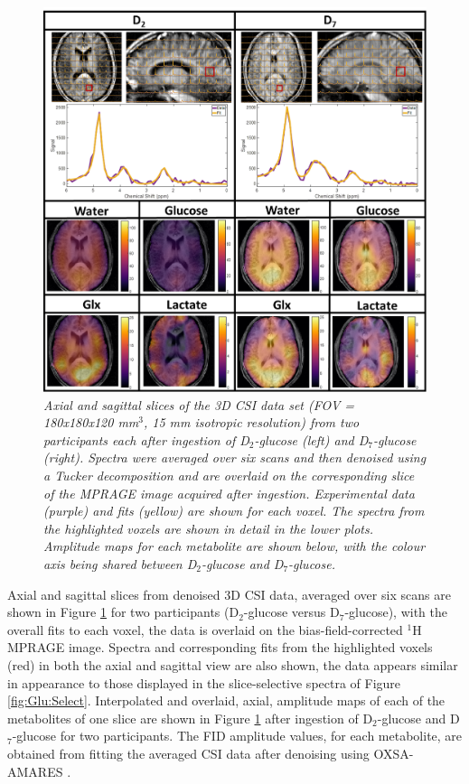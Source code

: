\begin{figure}
    \centering
    \includegraphics[width = 1\textwidth]{Figures/Glucose/CSI.png}
    \caption{\textit{Axial and sagittal slices of the 3D \ac{CSI} data set (\ac{FOV} = 180x180x120 mm$^3$, 15 mm isotropic resolution) from two participants each after ingestion of D$_2$-glucose (left) and D$_7$-glucose (right). Spectra were averaged over six scans and then denoised using a Tucker decomposition and are overlaid on the corresponding slice of the \ac{MPRAGE} image acquired after ingestion. Experimental data (purple) and fits (yellow) are shown for each voxel. The spectra from the highlighted voxels are shown in detail in the lower plots. Amplitude maps for each metabolite are shown below, with the colour axis being shared between D$_2$-glucose and D$_7$-glucose.}}
    \label{fig:Glu:CSI}
\end{figure}

Axial and sagittal slices from denoised 3D \ac{CSI} data, averaged over six scans are shown in Figure \ref{fig:Glu:CSI} for two participants (D$_2$-glucose versus D$_7$-glucose), with the overall fits to each voxel, the data is overlaid on the bias-field-corrected $^1$H \ac{MPRAGE} image. Spectra and corresponding fits from the highlighted voxels (red) in both the axial and sagittal view are also shown, the data appears similar in appearance to those displayed in the slice-selective spectra of Figure \ref{fig:Glu:Select}. Interpolated and overlaid, axial, amplitude maps of each of the metabolites of one slice are shown in Figure \ref{fig:Glu:CSI} after ingestion of D$_2$-glucose and D$_7$-glucose for two participants. The \ac{FID} amplitude values, for each metabolite, are obtained from fitting the averaged \ac{CSI} data after denoising using OXSA-AMARES \cite{Vanhamme1997ImprovedKnowledge, Purvis2017OXSA:MATLAB}.

